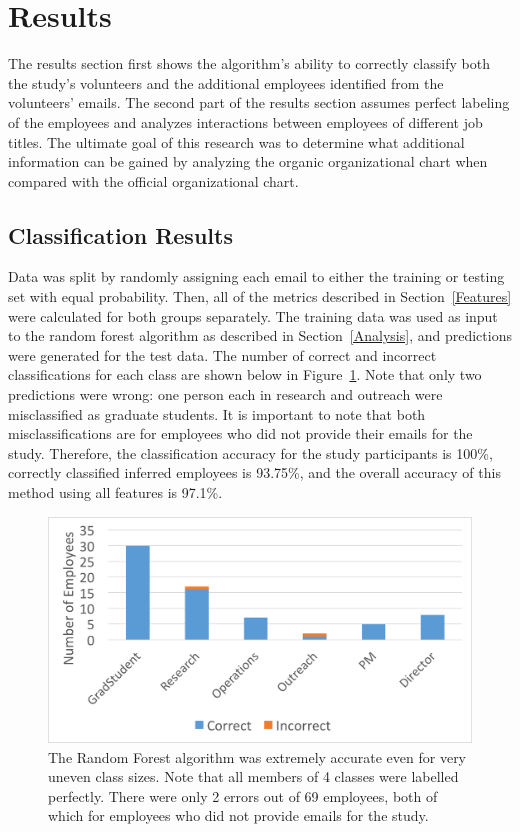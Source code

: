 \documentclass[10pt,twocolumn,conference]{IEEEtran}
\begin{document}
\section{Results} \label{Results}

The results section first shows the algorithm's ability to correctly classify both the study's volunteers and the additional employees identified from the volunteers' emails.  The second part of the results section assumes perfect labeling of the employees and analyzes interactions between employees of different job titles.  The ultimate goal of this research was to determine what additional information can be gained by analyzing the organic organizational chart when compared with the official organizational chart.

\subsection{Classification Results}
Data was split by randomly assigning each email to either the training or testing set with equal probability.  Then, all of the metrics described in Section~\ref{Features} were calculated for both groups separately.  The training data was used as input to the random forest algorithm as described in Section~\ref{Analysis}, and predictions were generated for the test data.  The number of correct and incorrect classifications for each class are shown below in Figure~\ref{fig:result_hist}.  Note that only two predictions were wrong: one person each in research and outreach were misclassified as graduate students.  It is important to note that both  misclassifications are for employees who did not provide their emails for the study.  Therefore, the classification accuracy for the study participants is 100\%, correctly classified inferred employees is 93.75\%, and the overall accuracy of this method using all features is 97.1\%.

\begin{figure}[t]
    \centering
    \includegraphics[width=\columnwidth,trim={1mm 2mm 1mm 3mm},clip]{Prediction_50_50_RF}
    \vspace{-20pt}
    \caption{The Random Forest algorithm was extremely accurate even for very uneven class sizes.  Note that all members of 4 classes were labelled perfectly.  There were only 2 errors out of 69 employees, both of which for employees who did not provide emails for the study.}
    \label{fig:result_hist}
\end{figure}
\end{document}
